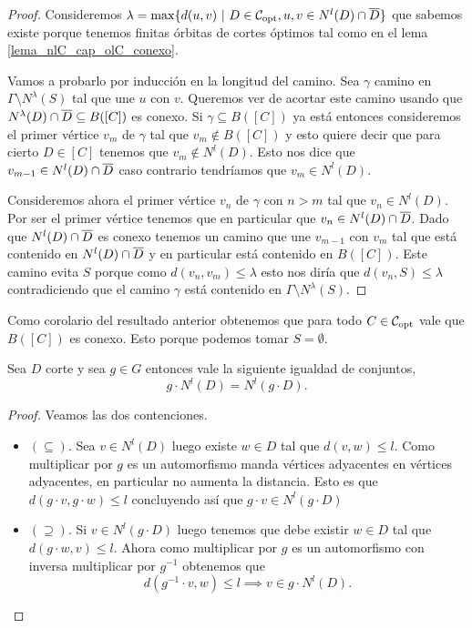 \documentclass[tesis.tex]{subfiles}
\begin{document}
\begin{proof}
	Consideremos $\lambda = \max \{ d(u,v) \ | \ D \in {\cal C}_{\text{opt}}, u,v \in N^l(D) \cap \overline D  \}$ que sabemos existe porque tenemos finitas órbitas de cortes óptimos tal como en el lema \ref{lema_nlC_cap_olC_conexo}. 	
	
	Vamos a probarlo por inducción en la longitud del camino.
	Sea $\gamma$ camino en $\Gamma \setminus N^{\lambda}(S)$ tal que une $u$ con $v$.
	Queremos ver de acortar este camino usando que $N^{\lambda}(D) \cap \overline D \subseteq B([C])$ es conexo.
	Si $\gamma \subseteq B([C])$ ya está entonces consideremos el primer vértice $v_m$ de $\gamma$ tal que $v_m \notin B([C])$ y esto quiere decir que para cierto $D \in [C]$ tenemos que $v_m \notin N^l(D)$.
	Esto nos dice que $v_{m-1} \in N^l(D) \cap \overline D$ caso contrario tendríamos que $v_m \in N^l(D)$.
	
	Consideremos ahora el primer vértice $v_n$ de $\gamma$ con $n > m$ tal que $v_n \in N^l(D)$.
	Por ser el primer vértice tenemos que en particular que $v_n \in N^l(D) \cap \overline D$.
	Dado que $N^l(D) \cap \overline D$ es conexo tenemos un camino que une $v_{m-1}$ con $v_m$ tal que está contenido en $N^l(D) \cap \overline D$ y en particular está contenido en $B([C])$.
	Este camino evita $S$ porque como $d(v_n,v_m) \le \lambda$ esto nos diría que $d(v_n,S) \le \lambda$ contradiciendo que el camino $\gamma$ está contenido en $\Gamma \setminus N^{\lambda}(S)$.	
\end{proof}


\begin{obs}
	Como corolario del resultado anterior obtenemos que para todo $C \in {\cal C}_{\text{opt}}$ vale que $B([C])$ es conexo.
	Esto porque podemos tomar $S = \emptyset$.
\end{obs}

\begin{lema}\label{lema_accion_vecinos}
	Sea $D$ corte y sea $g \in G$ entonces vale la siguiente igualdad de conjuntos,
	\[
		g \cdot N^l(D) = N^l(g \cdot D).
	\]
\end{lema}

\begin{proof}
	Veamos las dos contenciones.
	
	\begin{itemize}
		\item $(\subseteq)$. 
		Sea $v \in N^l(D)$ luego existe $w \in D$ tal que $d(v,w) \le l$.
		Como multiplicar por $g$ es un automorfismo manda vértices adyacentes en vértices adyacentes, en particular no aumenta la distancia.
		Esto es que $d(g\cdot v,g\cdot w) \le l$ concluyendo así que $g \cdot v \in N^l(g \cdot D)$  
		\item $(\supseteq)$.
		Si $v \in N^l(g\cdot D)$ luego tenemos que debe existir $w \in D$ tal que $d(g \cdot w, v) \le l$.
		Ahora como multiplicar por $g$ es un automorfismo con inversa multiplicar por $g^{-1}$ obtenemos que 
		\[
			d(g^{-1} \cdot v, w) \le l \implies v \in g\cdot N^l(D).
		\]
	\end{itemize}
\end{proof}
\end{document}
